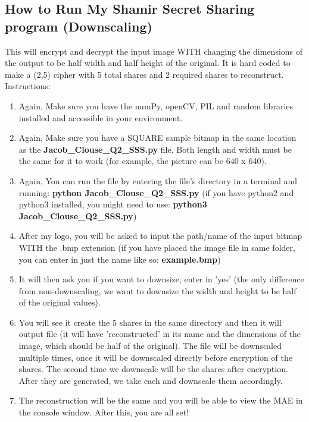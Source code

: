 \documentclass[10pt]{article}
\begin{document}
\subsection{How to Run My Shamir Secret Sharing program (Downscaling) } 
\noindent This will encrypt and decrypt the input image WITH changing the dimensions of the output to be half width and half height of the original. It is hard coded to make a (2,5) cipher with 5 total shares and 2 required shares to reconstruct. \\ Instructions: 
\begin{enumerate}
	\item Again, Make sure you have the numPy, openCV, PIL and random libraries installed and accessible in your environment.
	
	\item Again, Make sure you have a SQUARE sample bitmap in the same location as the \textbf{Jacob\_Clouse\_Q2\_SSS.py} file. Both length and width must be the same for it to work (for example, the picture can be 640 x 640).
	
	\item Again, You can run the file by entering the file's directory in a terminal and running: \textbf{python Jacob\_Clouse\_Q2\_SSS.py} (if you have python2 and python3 installed, you might need to use: \textbf{python3 Jacob\_Clouse\_Q2\_SSS.py})
	
	\item After my logo, you will be asked to input the path/name of the input bitmap WITH the .bmp extension (if you have placed the image file in same folder, you can enter in just the name like so: \textbf{example.bmp})
	
	\item It will then ask you if you want to downsize, enter in 'yes' (the only difference from non-downscaling, we want to downsize the width and height to be half of the original values). 
	
	\item You will see it create the 5 shares in the same directory and then it will output file (it will have 'reconstructed' in its name and the dimensions of the image, which should be half of the original). 
	\subitem The file will be downscaled multiple times, once it will be downscaled directly before encryption of the shares. 
	\subitem The second time we downscale will be the shares after encryption. After they are generated, we take each and downscale them accordingly.
	
	\item The reconstruction will be the same and you will be able to view the MAE in the console window. After this, you are all set!
	
\end{enumerate}

\vspace{0.2in}
\end{document}
